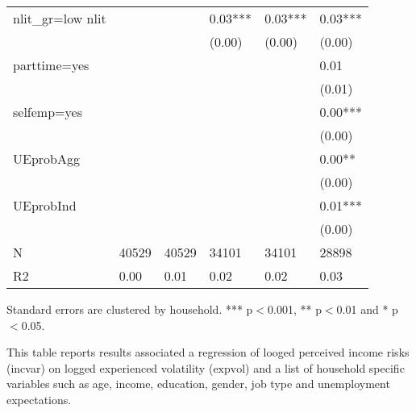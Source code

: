\begin{table}[p]
\begin{adjustbox}{width=\textwidth}
\begin{threeparttable}
\begin{tabular}{llllll}
nlit\_gr=low nlit &          &           &    0.03*** &     0.03*** &      0.03*** \\
                 &          &           &     (0.00) &      (0.00) &       (0.00) \\
parttime=yes     &          &           &            &             &         0.01 \\
                 &          &           &            &             &       (0.01) \\
selfemp=yes      &          &           &            &             &      0.00*** \\
                 &          &           &            &             &       (0.00) \\
UEprobAgg        &          &           &            &             &       0.00** \\
                 &          &           &            &             &       (0.00) \\
UEprobInd        &          &           &            &             &      0.01*** \\
                 &          &           &            &             &       (0.00) \\
N                &    40529 &     40529 &      34101 &       34101 &        28898 \\
R2               &     0.00 &      0.01 &       0.02 &        0.02 &         0.03 \\
\bottomrule
\end{tabular}
\begin{tablenotes}\item Standard errors are clustered by household. *** p$<$0.001, ** p$<$0.01 and * p$<$0.05. 
\item This table reports results associated a regression of looged perceived income risks (incvar) on logged experienced volatility ($\text{expvol}$) and a list of household specific variables such as age, income, education, gender, job type and unemployment expectations.
\end{tablenotes}
\end{threeparttable}
\end{adjustbox}
\end{table}
\clearpage

